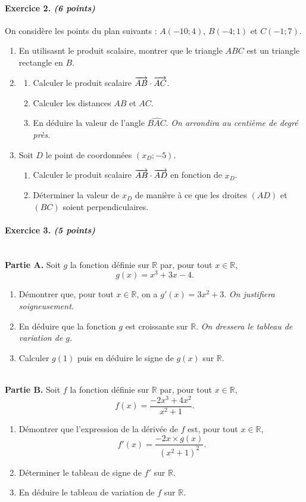 \documentclass[11pt]{article}
\begin{document}
\paragraph{Exercice 2. \emph{(6 points)}}
On considère les points du plan suivants : $A(-10; 4)$, $B\left( -4; 1
\right)$ et $C\left( -1; 7 \right)$.
\begin{enumerate}
  \item En utilisasnt le produit scalaire, montrer que le triangle $ABC$ est un
    triangle rectangle en $B$.
  \item \begin{enumerate}
      \item Calculer le produit scalaire $\overrightarrow{AB}\cdot\overrightarrow{AC}$.
      \item Calculer les distances $AB$ et $AC$.
      \item En déduire la valeur de l'angle $\widehat{BAC}$. \emph{On arrondira
        au centième de degré près.}
    \end{enumerate}
  \item Soit $D$ le point de coordonnées $(x_D; -5)$.
    \begin{enumerate}
      \item Calculer le produit scalaire $\overrightarrow{AB}\cdot\overrightarrow{AD}$ en fonction
        de $x_D$.
      \item Déterminer la valeur de $x_D$ de manière à ce que les droites
        $\left( AD \right)$ et $\left( BC \right)$ soient perpendiculaires.
    \end{enumerate}
\end{enumerate}

\paragraph{Exercice 3. \emph{(5 points)}}~\\[5mm]
\textbf{Partie A.} Soit $g$ la fonction définie sur $\mathbb{R}$ par, pour tout
$x\in\mathbb{R}$, 
\[
  g(x) = x^3 + 3x - 4.
\]
\begin{enumerate}
  \item Démontrer que, pour tout $x\in\mathbb{R}$, on a $g'(x) = 3x^2+3$.
    \emph{On justifiera soigneusement.}
  \item En déduire que la fonction $g$ est croissante sur $\mathbb{R}$.
    \emph{On dressera le tableau de variation de $g$.}
  \item Calculer $g(1)$ puis en déduire le signe de $g(x)$ sur $\mathbb{R}$.
\end{enumerate}
~\\[5mm]
\noindent\textbf{Partie B.} Soit $f$ la fonction définie sur $\mathbb{R}$ par, pour tout
$x\in\mathbb{R}$,
\[
  f(x) = \frac{-2x^3 + 4x^2}{x^2+1}.
\]
\begin{enumerate}
  \item Démontrer que l'expression de la dérivée de $f$ est, pour tout
    $x\in\mathbb{R}$,
    \[
      f'(x) = \frac{-2x\times g(x)}{\left( x^2+1 \right)^2}.
    \]
  \item Déterminer le tableau de signe de $f'$ sur $\mathbb{R}$.
  \item En déduire le tableau de variation de $f$ sur $\mathbb{R}$.
\end{enumerate}
\end{document}
